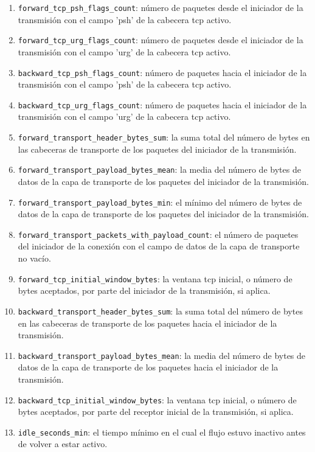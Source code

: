 \begin{enumerate}
  \item \texttt{forward\_tcp\_psh\_flags\_count}: número de paquetes desde el iniciador de la transmisión con el campo 'psh' de la cabecera \acrshort{tcp} activo.
  \item \texttt{forward\_tcp\_urg\_flags\_count}: número de paquetes desde el iniciador de la transmisión con el campo 'urg' de la cabecera \acrshort{tcp} activo.
  \item \texttt{backward\_tcp\_psh\_flags\_count}: número de paquetes hacia el iniciador de la transmisión con el campo 'psh' de la cabecera \acrshort{tcp} activo.
  \item \texttt{backward\_tcp\_urg\_flags\_count}: número de paquetes hacia el iniciador de la transmisión con el campo 'urg' de la cabecera \acrshort{tcp} activo.
  \item \texttt{forward\_transport\_header\_bytes\_sum}: la suma total del número de bytes en las cabeceras de transporte de los paquetes del iniciador de la transmisión.
  \item \texttt{forward\_transport\_payload\_bytes\_mean}: la media del número de bytes de datos de la capa de transporte de los paquetes del iniciador de la transmisión.
  \item \texttt{forward\_transport\_payload\_bytes\_min}: el mínimo del número de bytes de datos de la capa de transporte de los paquetes del iniciador de la transmisión.
  \item \texttt{forward\_transport\_packets\_with\_payload\_count}: el número de paquetes del iniciador de la conexión con el campo de datos de la capa de transporte no vacío.
  \item \texttt{forward\_tcp\_initial\_window\_bytes}: la ventana \acrshort{tcp} inicial, o número de bytes aceptados, por parte del iniciador de la transmisión, si aplica.
  \item \texttt{backward\_transport\_header\_bytes\_sum}: la suma total del número de bytes en las cabeceras de transporte de los paquetes hacia el iniciador de la transmisión.
  \item \texttt{backward\_transport\_payload\_bytes\_mean}: la media del número de bytes de datos de la capa de transporte de los paquetes hacia el iniciador de la transmisión.
  \item \texttt{backward\_tcp\_initial\_window\_bytes}: la ventana \acrshort{tcp} inicial, o número de bytes aceptados, por parte del receptor inicial de la transmisión, si aplica.
  \item \texttt{idle\_seconds\_min}: el tiempo mínimo en el cual el flujo estuvo inactivo antes de volver a estar activo.

\end{enumerate}
